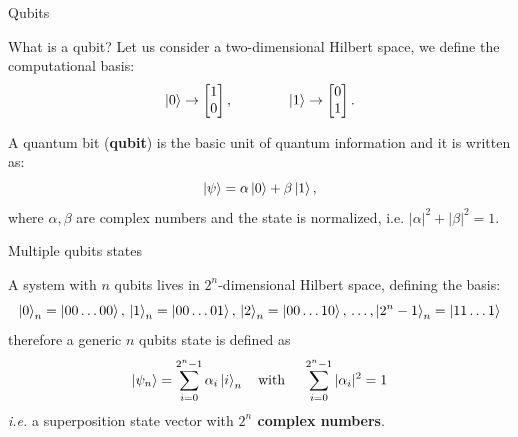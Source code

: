 \documentclass[aspectratio=169, 8pt, xcolor={svgnames}, hyperref={linkcolor=black}]{beamer}
\begin{document}
\begin{frame}{Qubits}
\begin{figure}
        \end{figure}
\end{frame}

\begin{frame}[fragile]{What is a qubit?}
   \pause
   Let us consider a two-dimensional {\color{blue}Hilbert space}, we define the computational basis:
   \begin{equation*}
   \ket{0} \rightarrow  \begin{bmatrix} 1 \\ 0 \end{bmatrix}, \qquad \qquad
   \ket{1} \rightarrow  \begin{bmatrix} 0 \\ 1 \end{bmatrix}.
   \end{equation*}

   A {\color{red}quantum bit} (\textbf{qubit}) is the basic unit of quantum information and it is written as:
   \begin{equation*}
   \ket{\psi}=\alpha\ket{0} +\beta\ket{1},
   \end{equation*}
   where $\alpha, \beta$ are {\color{violet}complex numbers} and the {\color{blue}state is normalized}, i.e. $|\alpha|^2+|\beta|^2=1$.


 \end{frame}

 \begin{frame}[fragile]{Multiple qubits states}

 A system with $n$ qubits lives in {\color{red}$2^n$-dimensional Hilbert space}, defining the basis:
 \begin{equation*}
 \ket{0}_n = \ket{00\dots0 0},\, \ket{1}_n = \ket{00\dots01},\, \ket{2}_n = \ket{00\dots10}, \, \dots, \ket{2^n -1}_n = \ket{11\dots1}
 \end{equation*}
 therefore a generic $n$ qubits state is defined as
 \begin{equation*}
 \ket{\psi_n}= \sum_{i=0}^{2^n-1} \alpha_i \ket{i}_n \quad \text{with } \quad  \sum_{i=0}^{2^n-1} |\alpha_i |^2 = 1
 \end{equation*}
 \textit{i.e.} a {\color{blue}superposition state vector} with \textbf{$2^n$ complex numbers}.

 \end{frame}
\end{document}
